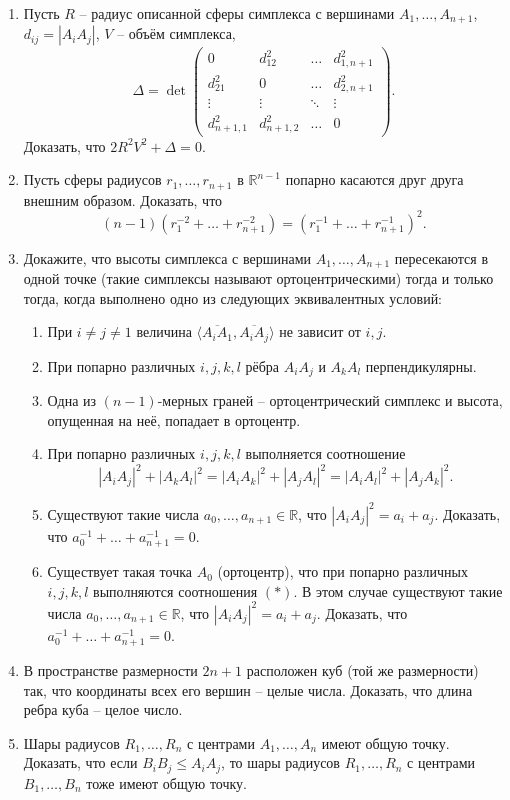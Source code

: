 \begin{enumerate}
		\item Пусть $R$ -- радиус описанной сферы симплекса с вершинами $A_1,\dots,A_{n+1}$, $d_{ij} = |A_i A_j|$, $V$ -- объём симплекса, 
		\[
			\Delta = \det \begin{pmatrix}
				0 & d_{12}^2 & \dots & d_{1,n+1}^2 \\
				d_{21}^2 & 0 & \dots & d_{2,n+1}^2 \\
				\vdots & \vdots & \ddots & \vdots \\
				d_{n+1,1}^2 & d_{n+1,2}^2 & \dots & 0
			\end{pmatrix}.
		\]
		Доказать, что $2 R^2 V^2 + \Delta = 0$.

		\item Пусть сферы радиусов $r_1,\dots,r_{n+1}$ в $\mathbb{R}^{n-1}$ попарно касаются друг друга внешним образом. Доказать, что 
		\[
			(n-1)(r_1^{-2} + \dots + r_{n+1}^{-2}) = (r_1^{-1} + \dots + r_{n+1}^{-1})^2.
		\]

		\item Докажите, что высоты симплекса с вершинами $A_1,\dots,A_{n+1}$ пересекаются в одной точке (такие симплексы называют ортоцентрическими) тогда и только тогда, когда выполнено одно из следующих эквивалентных условий:
		  \begin{enumerate}
			  \item При $i \ne j \ne 1$ величина $\langle \overline{A_i A_1}, \overline{A_i A_j} \rangle$ не зависит от $i,j$.
			  \item При попарно различных $i,j,k,l$ рёбра $A_i A_j$ и $A_k A_l$ перпендикулярны.
			  \item Одна из $(n-1)$-мерных граней -- ортоцентрический симплекс и высота, опущенная на неё, попадает в ортоцентр.
			  \item При попарно различных $i,j,k,l$ выполняется соотношение 
			  \[
				  |A_i A_j|^2 + |A_k A_l|^2 = |A_i A_k|^2 + |A_j A_l|^2 = |A_i A_l|^2 + |A_j A_k|^2.
			  \]
			  \item Существуют такие числа $a_0,\dots,a_{n+1} \in \mathbb{R}$, что $|A_i A_j|^2 = a_i + a_j$. Доказать, что $a_0^{-1} + \dots + a_{n+1}^{-1} = 0$.
			  \item Существует такая точка $A_0$ (ортоцентр), что при попарно различных $i,j,k,l$ выполняются соотношения $(*)$. В этом случае существуют такие числа $a_0,\dots,a_{n+1} \in \mathbb{R}$, что $|A_i A_j|^2 = a_i + a_j$. Доказать, что $a_0^{-1} + \dots + a_{n+1}^{-1} = 0$.
		  \end{enumerate}

		\item В пространстве размерности $2n+1$ расположен куб (той же размерности) так, что координаты всех его вершин -- целые числа.  
		Доказать, что длина ребра куба -- целое число.

		\item Шары радиусов $R_1,\dots,R_n$ с центрами $A_1,\dots,A_n$ имеют общую точку. Доказать, что если $B_i B_j \le A_i A_j$, то шары радиусов $R_1,\dots,R_n$ с центрами $B_1,\dots,B_n$ тоже имеют общую точку.
	\end{enumerate}

